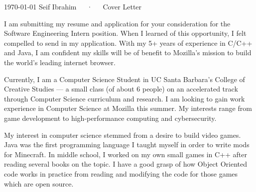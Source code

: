 \documentclass[11pt, letterpaper]{awesome-cv}
\begin{document}
\makecvheader[R]

\makecvfooter
  {\today}
  {Seif Ibrahim~~~·~~~Cover Letter}
  {\mbox{}}

  \makelettertitle

\begin{cvletter}

I am submitting my resume and application for your consideration for the Software Engineering Intern position. When I learned of this opportunity, I felt compelled to send in my application. With my 5+ years of experience in C/C++ and Java, I am confident my skills will be of benefit to Mozilla's mission to build the world's leading internet browser. 

Currently, I am a Computer Science Student in UC Santa Barbara's College of Creative Studies --- a small class (of about 6 people) on an accelerated track through Computer Science curriculum and research. I am looking to gain work experience in Computer Science at Mozilla this summer. My interests range from game development to high-performance computing and cybersecurity. 

My interest in computer science stemmed from a desire to build video games. Java was the first programming language I taught myself in order to write mods for Minecraft. In middle school, I worked on my own small games in C++ after reading several books on the topic. I have a good grasp of how Object Oriented code works in practice from reading and modifying the code for those games which are open source.


\end{cvletter}
\end{document}
